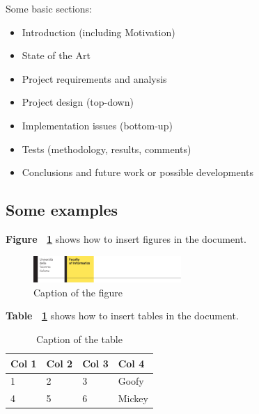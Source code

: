 \documentclass[]{usiinfbachelorproject}
\begin{document}
Some basic sections:
\begin{itemize}
\item Introduction (including Motivation)
\item State of the Art
\item Project requirements and analysis
\item Project design (top-down)
\item Implementation issues (bottom-up)
\item Tests (methodology, results, comments)
\item Conclusions and future work or possible developments
\end{itemize} 

\subsection {Some examples}

\textbf{Figure ~\ref{fig:USILogo}} shows how to insert figures in the document.

\begin{figure} [h]
\centering
\includegraphics[width=0.5\textwidth]{logo-info.pdf}
\caption{Caption of the figure}
\label{fig:USILogo}
\end{figure}

\noindent\textbf{Table ~\ref{tab:numbers}} shows how to insert tables in the document.

\begin{table}[h]
\centering
{} {
\begin{normalsize}\begin{tabular}{l|lll}
\textbf{Col 1} & \textbf{Col 2} & \textbf{Col 3} & \textbf{Col 4}\\
\hline
1 & 2 & 3 & Goofy\\
4 & 5 & 6 & Mickey
\end{tabular}
\end{normalsize}
}
\caption{Caption of the table}
\label{tab:numbers}
\end{table}




\end{document}
